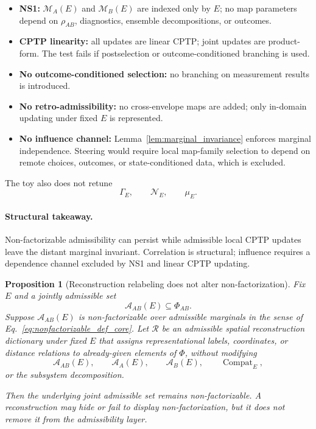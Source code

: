 \documentclass[aps,prx,onecolumn,11pt]{revtex4-2}
\theoremstyle{plain}
\newtheorem{proposition}{Proposition}
\theoremstyle{definition}
\theoremstyle{remark}
\newcommand{\Compat}{\operatorname{Compat}} %
\begin{document}
\begin{itemize}

\item \textbf{NS1:}
\(\mathcal M_A(E)\) and \(\mathcal M_B(E)\) are indexed only by \(E\);
no map parameters depend on \(\rho_{AB}\), diagnostics, ensemble
decompositions, or outcomes.

\item \textbf{CPTP linearity:}
all updates are linear CPTP; joint updates are product-form. The test
fails if postselection or outcome-conditioned branching is used.

\item \textbf{No outcome-conditioned selection:}
no branching on measurement results is introduced.

\item \textbf{No retro-admissibility:}
no cross-envelope maps are added; only in-domain updating under fixed
\(E\) is represented.

\item \textbf{No influence channel:}
Lemma~\ref{lem:marginal_invariance} enforces marginal independence.
Steering would require local map-family selection to depend on remote
choices, outcomes, or state-conditioned data, which is excluded.

\end{itemize}

The toy also does not retune
\[
\Gamma_E,
\qquad
\mathcal N_E,
\qquad
\mu_E.
\]

\paragraph{Structural takeaway.}

Non-factorizable admissibility can persist while admissible local CPTP
updates leave the distant marginal invariant. Correlation is structural;
influence requires a dependence channel excluded by NS1 and linear CPTP
updating.

\begin{proposition}[Reconstruction relabeling does not alter non-factorization]
\label{prop:nonfact_reconstruction_invariant}
Fix \(E\) and a jointly admissible set
\[
\mathcal A_{AB}(E)\subseteq\Phi_{AB}.
\]
Suppose \(\mathcal A_{AB}(E)\) is non-factorizable over admissible
marginals in the sense of
Eq.~\eqref{eq:nonfactorizable_def_core}. Let \(\mathcal R\) be an
admissible spatial reconstruction dictionary under fixed \(E\) that
assigns representational labels, coordinates, or distance relations to
already-given elements of \(\Phi\), without modifying
\[
\mathcal A_{AB}(E),
\qquad
\mathcal A_A(E),
\qquad
\mathcal A_B(E),
\qquad
\Compat_E,
\]
or the subsystem decomposition.

Then the underlying joint admissible set remains non-factorizable. A
reconstruction may hide or fail to display non-factorization, but it
does not remove it from the admissibility layer.
\end{proposition}
\end{document}
